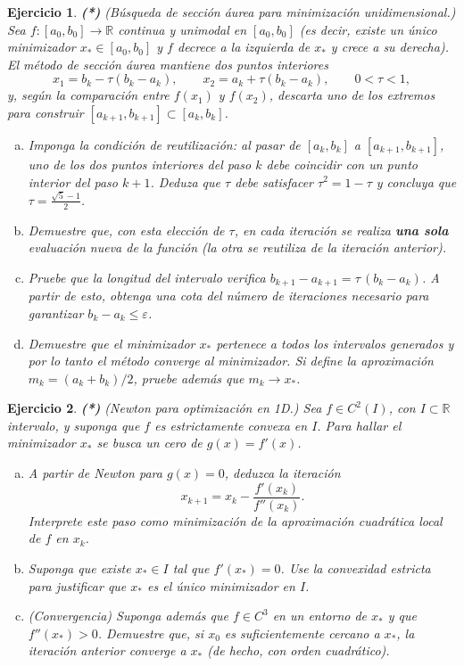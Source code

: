 \documentclass[12pt]{article}
\newtheorem{exercise}{Ejercicio}
\newcommand{\bej}{\begin{exercise}\rm}
\newcommand{\fej}{\end{exercise}}
\newcommand{\R}{\mathbb{R}}
\begin{document}
\bej\textbf{(*)} (Búsqueda de sección áurea para minimización unidimensional.) Sea $f:[a_0,b_0]\to\R$ continua y unimodal en $[a_0,b_0]$ (es decir, existe un único minimizador
$x_\ast\in[a_0,b_0]$ y $f$ decrece a la izquierda de $x_\ast$ y crece a su derecha).
El método de sección áurea mantiene dos puntos interiores
\[
	x_1 = b_k - \tau(b_k-a_k),\qquad x_2 = a_k + \tau(b_k-a_k),\qquad 0<\tau<1,
\]
y, según la comparación entre $f(x_1)$ y $f(x_2)$, descarta uno de los extremos para construir
$[a_{k+1},b_{k+1}]\subset[a_k,b_k]$.
\begin{enumerate}[(a)]
	\item Imponga la condición de \emph{reutilización}: al pasar de $[a_k,b_k]$ a $[a_{k+1},b_{k+1}]$,
	uno de los dos puntos interiores del paso $k$ debe coincidir con un punto interior del paso $k+1$.
	Deduza que $\tau$ debe satisfacer $\tau^2 = 1-\tau$ y concluya que $\tau = \frac{\sqrt{5}-1}{2}$.
	\item Demuestre que, con esta elección de $\tau$, en cada iteración se realiza \textbf{una sola}
	evaluación nueva de la función (la otra se reutiliza de la iteración anterior).
	\item Pruebe que la longitud del intervalo verifica $b_{k+1}-a_{k+1} = \tau\,(b_k-a_k)$. A partir de esto, obtenga una cota del número de iteraciones necesario para garantizar
	$b_k-a_k\leq \varepsilon$.
	\item Demuestre que el minimizador $x_\ast$ pertenece a todos los intervalos generados y por lo tanto el método converge al minimizador. Si define la aproximación
	$m_k=(a_k+b_k)/2$, pruebe además que $m_k\to x_\ast$.
\end{enumerate}
\fej

\bej\textbf{(*)} (Newton para optimización en 1D.)
Sea $f\in C^2(I)$, con $I\subset\R$ intervalo, y suponga que $f$ es estrictamente convexa en $I$.
Para hallar el minimizador $x_\ast$ se busca un cero de $g(x)=f'(x)$.
\begin{enumerate}[(a)]
	\item A partir de Newton para $g(x)=0$, deduzca la iteración
	\[
		x_{k+1}=x_k-\frac{f'(x_k)}{f''(x_k)}.
	\]
	Interprete este paso como minimización de la aproximación cuadrática local de $f$ en $x_k$.

	\item Suponga que existe $x_\ast\in I$ tal que $f'(x_\ast)=0$. Use la convexidad estricta para justificar
	que $x_\ast$ es el único minimizador en $I$.

	\item (Convergencia) Suponga además que $f\in C^3$ en un entorno de $x_\ast$ y que
	$f''(x_\ast)>0$. Demuestre que, si $x_0$ es suficientemente cercano a $x_\ast$, la iteración anterior
	converge a $x_\ast$ (de hecho, con orden cuadrático).
\end{enumerate}
\fej
\end{document}
